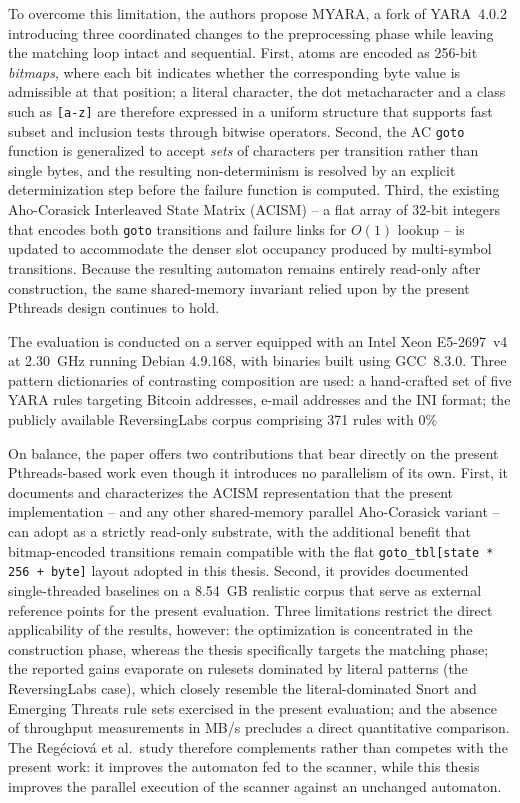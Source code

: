 To overcome this limitation, the authors propose MYARA, a fork of YARA~4.0.2 introducing three coordinated changes to the preprocessing phase while leaving the matching loop intact and sequential. First, atoms are encoded as 256-bit \emph{bitmaps}, where each bit indicates whether the corresponding byte value is admissible at that position; a literal character, the dot metacharacter and a class such as \texttt{[a-z]} are therefore expressed in a uniform structure that supports fast subset and inclusion tests through bitwise operators. Second, the AC \texttt{goto} function is generalized to accept \emph{sets} of characters per transition rather than single bytes, and the resulting non-determinism is resolved by an explicit determinization step before the failure function is computed. Third, the existing Aho-Corasick Interleaved State Matrix (ACISM) -- a flat array of 32-bit integers that encodes both \texttt{goto} transitions and failure links for $O(1)$ lookup -- is updated to accommodate the denser slot occupancy produced by multi-symbol transitions. Because the resulting automaton remains entirely read-only after construction, the same shared-memory invariant relied upon by the present Pthreads design continues to hold.

The evaluation is conducted on a server equipped with an Intel Xeon E5-2697~v4 at 2.30~GHz running Debian 4.9.168, with binaries built using GCC~8.3.0. Three pattern dictionaries of contrasting composition are used: a hand-crafted set of five YARA rules targeting Bitcoin addresses, e-mail addresses and the INI format; the publicly available ReversingLabs corpus comprising 371 rules with $0\%$

On balance, the paper offers two contributions that bear directly on the present Pthreads-based work even though it introduces no parallelism of its own. First, it documents and characterizes the ACISM representation that the present implementation -- and any other shared-memory parallel Aho-Corasick variant -- can adopt as a strictly read-only substrate, with the additional benefit that bitmap-encoded transitions remain compatible with the flat \texttt{goto\_tbl[state * 256 + byte]} layout adopted in this thesis. Second, it provides documented single-threaded baselines on a 8.54~GB realistic corpus that serve as external reference points for the present evaluation. Three limitations restrict the direct applicability of the results, however: the optimization is concentrated in the construction phase, whereas the thesis specifically targets the matching phase; the reported gains evaporate on rulesets dominated by literal patterns (the ReversingLabs case), which closely resemble the literal-dominated Snort and Emerging Threats rule sets exercised in the present evaluation; and the absence of throughput measurements in MB/s precludes a direct quantitative comparison. The Reg{\'e}ciov{\'a} et al.\ study therefore complements rather than competes with the present work: it improves the automaton fed to the scanner, while this thesis improves the parallel execution of the scanner against an unchanged automaton.

